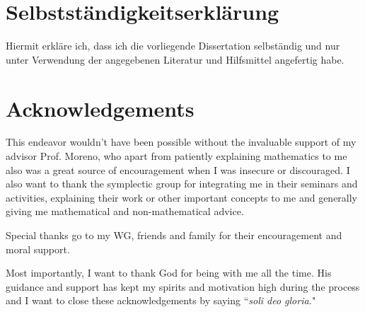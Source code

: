 \section*{Selbstständigkeitserklärung}

Hiermit erkläre ich, dass ich die vorliegende Dissertation selbständig und nur unter
Verwendung der angegebenen Literatur und Hilfsmittel angefertig habe.

\newpage

\section*{Acknowledgements}

This endeavor wouldn't have been possible without the invaluable support of my advisor Prof. Moreno, who apart from patiently explaining mathematics to me
also was a great source of encouragement when I was insecure or discouraged.
I also want to thank the symplectic group for integrating me in their seminars and activities, explaining their work or other important concepts to me
and generally giving me mathematical and non-mathematical advice.

Special thanks go to my WG, friends and family for their encouragement and moral support. 

Most importantly, I want to thank God for being with me all the time. 
His guidance and support has kept my spirits and motivation high during the process and I want to close these acknowledgements by saying 
``\textit{soli deo gloria.}"
\newpage